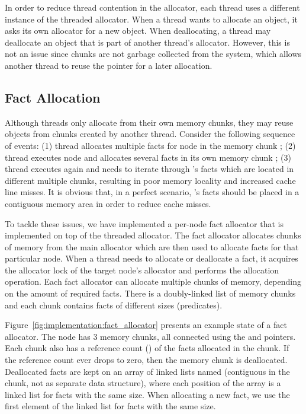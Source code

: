 In order to reduce thread contention in the allocator, each thread uses a
different instance of the threaded allocator. When a thread wants to allocate an
object, it asks its own allocator for a new object. When deallocating, a thread
may deallocate an object that is part of another thread's allocator. However,
this is not an issue since chunks are not garbage collected from the system,
which allows another thread to reuse the pointer for a later allocation.

\iffalse
\subsection{Fact Allocation}

Although threads only allocate from their own memory chunks, they may reuse
objects from chunks created by another thread. Consider the following sequence
of events: (1) thread  allocates multiple facts for node  in
the memory chunk ; (2) thread  executes node  and
allocates several facts in its own memory chunk ; (3) thread 
executes  again and needs to iterate through 's facts which are
located in different multiple chunks, resulting in poor memory locality and
increased cache line misses. It is obvious that, in a perfect scenario,
's facts should be placed in a contiguous memory area in order to reduce
cache misses.

To tackle these issues, we have implemented a per-node fact allocator that is
implemented on top of the threaded allocator. The fact allocator allocates
chunks of memory from the main allocator which are then used to allocate facts
for that particular node. When a thread needs to allocate or deallocate a fact,
it acquires the allocator lock of the target node's allocator and performs the
allocation operation. Each fact allocator can allocate multiple chunks of
memory, depending on the amount of required facts. There is a doubly-linked list
of memory chunks and each chunk contains facts of different sizes (predicates).

Figure~\ref{fig:implementation:fact_allocator} presents an example state of a
fact allocator. The node has 3 memory chunks, all connected using the
 and  pointers. Each chunk also has a reference count
() of the facts allocated in the chunk. If the reference count
ever drops to zero, then the memory chunk is deallocated. Deallocated facts are
kept on an array of linked lists named  (contiguous in the
chunk, not as separate data structure), where each position of the array is a
linked list for facts with the same size. When allocating a new fact, we use the
first element of the linked list for facts with the same size.

